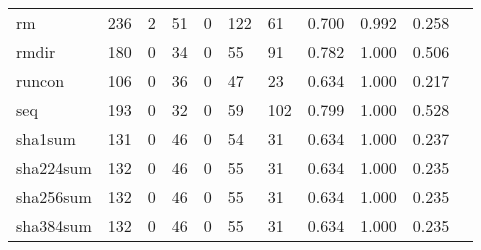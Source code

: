 \begin{longtable}{lp{1.10cm}p{1.10cm}p{1.10cm}p{1.10cm}p{1.10cm}p{1.10cm}p{1.10cm}p{1.10cm}p{1.10cm}p{1.10cm}}
rm        &                    236 &                                  2 &                                51 &                                0 &                               122 &                              61 &                          0.700 &                                 0.992 &                               0.258 \\
rmdir     &                    180 &                                  0 &                                34 &                                0 &                                55 &                              91 &                          0.782 &                                 1.000 &                               0.506 \\
runcon    &                    106 &                                  0 &                                36 &                                0 &                                47 &                              23 &                          0.634 &                                 1.000 &                               0.217 \\
seq       &                    193 &                                  0 &                                32 &                                0 &                                59 &                             102 &                          0.799 &                                 1.000 &                               0.528 \\
sha1sum   &                    131 &                                  0 &                                46 &                                0 &                                54 &                              31 &                          0.634 &                                 1.000 &                               0.237 \\
sha224sum &                    132 &                                  0 &                                46 &                                0 &                                55 &                              31 &                          0.634 &                                 1.000 &                               0.235 \\
sha256sum &                    132 &                                  0 &                                46 &                                0 &                                55 &                              31 &                          0.634 &                                 1.000 &                               0.235 \\
sha384sum &                    132 &                                  0 &                                46 &                                0 &                                55 &                              31 &                          0.634 &                                 1.000 &                               0.235 \\

\end{longtable}
